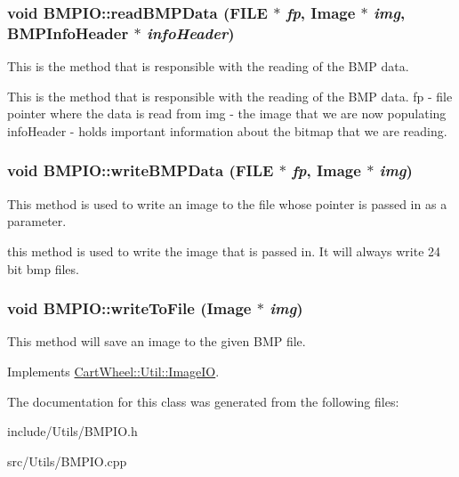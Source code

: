 \hypertarget{classCartWheel_1_1Util_1_1BMPIO_aa68430d62acfd0ada0da17d2e6f64f3b}{
\subsubsection[{readBMPData}]{\setlength{\rightskip}{0pt plus 5cm}void BMPIO::readBMPData (FILE $\ast$ {\em fp}, \/  {\bf Image} $\ast$ {\em img}, \/  {\bf BMPInfoHeader} $\ast$ {\em infoHeader})}}
\label{classCartWheel_1_1Util_1_1BMPIO_aa68430d62acfd0ada0da17d2e6f64f3b}
This is the method that is responsible with the reading of the BMP data.

This is the method that is responsible with the reading of the BMP data. fp -\/ file pointer where the data is read from img -\/ the image that we are now populating infoHeader -\/ holds important information about the bitmap that we are reading. \hypertarget{classCartWheel_1_1Util_1_1BMPIO_a15c96abcfc88291fab0bcaf8ecad0a10}{
\subsubsection[{writeBMPData}]{\setlength{\rightskip}{0pt plus 5cm}void BMPIO::writeBMPData (FILE $\ast$ {\em fp}, \/  {\bf Image} $\ast$ {\em img})}}
\label{classCartWheel_1_1Util_1_1BMPIO_a15c96abcfc88291fab0bcaf8ecad0a10}
This method is used to write an image to the file whose pointer is passed in as a parameter.

this method is used to write the image that is passed in. It will always write 24 bit bmp files. \hypertarget{classCartWheel_1_1Util_1_1BMPIO_a5669139891fc0f0499c115c55c0b309b}{
\subsubsection[{writeToFile}]{\setlength{\rightskip}{0pt plus 5cm}void BMPIO::writeToFile ({\bf Image} $\ast$ {\em img})}}
\label{classCartWheel_1_1Util_1_1BMPIO_a5669139891fc0f0499c115c55c0b309b}
This method will save an image to the given BMP file. 

Implements \hyperlink{classCartWheel_1_1Util_1_1ImageIO_a49ce6fbe969f416bc526954f4d13b062}{CartWheel::Util::ImageIO}.



The documentation for this class was generated from the following files:\begin{DoxyCompactItemize}
\item 
include/Utils/BMPIO.h\item 
src/Utils/BMPIO.cpp\end{DoxyCompactItemize}
